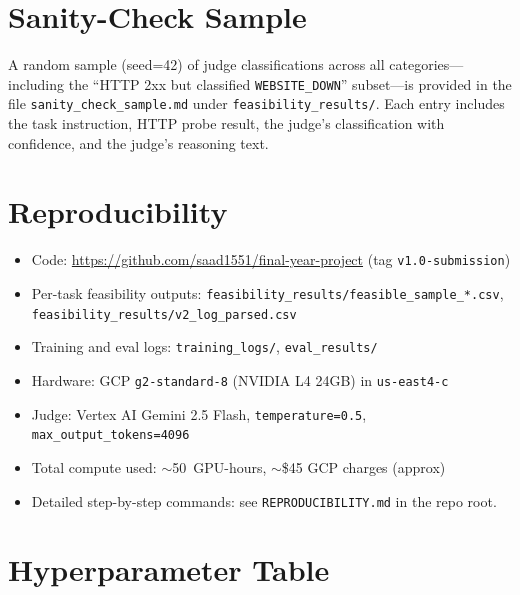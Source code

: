 \documentclass[12pt,a4paper]{report}
\begin{document}
\appendix

\chapter{Sanity-Check Sample}
\label{app:sanity-check}

A random sample (seed=42) of judge classifications across all categories---including the ``HTTP 2xx but classified \texttt{WEBSITE\_DOWN}'' subset---is provided in the file \texttt{sanity\_check\_sample.md} under \texttt{feasibility\_results/}. Each entry includes the task instruction, HTTP probe result, the judge's classification with confidence, and the judge's reasoning text.

\chapter{Reproducibility}

\begin{itemize}
  \item Code: \url{https://github.com/saad1551/final-year-project} (tag \texttt{v1.0-submission})
  \item Per-task feasibility outputs: \texttt{feasibility\_results/feasible\_sample\_*.csv}, \texttt{feasibility\_results/v2\_log\_parsed.csv}
  \item Training and eval logs: \texttt{training\_logs/}, \texttt{eval\_results/}
  \item Hardware: GCP \texttt{g2-standard-8} (NVIDIA L4 24GB) in \texttt{us-east4-c}
  \item Judge: Vertex AI Gemini 2.5 Flash, \texttt{temperature=0.5}, \texttt{max\_output\_tokens=4096}
  \item Total compute used: $\sim$50~GPU-hours, $\sim$\$45 GCP charges (approx)
  \item Detailed step-by-step commands: see \texttt{REPRODUCIBILITY.md} in the repo root.
\end{itemize}

\chapter{Hyperparameter Table}
\end{document}
